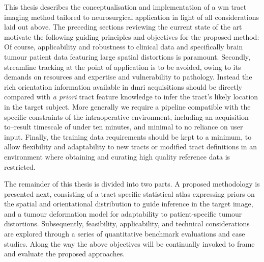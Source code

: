 This thesis describes the conceptualisation and implementation of a \gls{wm} tract imaging method tailored to neurosurgical application in light of all considerations laid out above.
The preceding sections reviewing the current state of the art motivate the following guiding principles and objectives for the proposed method:
Of course, applicability and robustness to clinical data and specifically brain tumour patient data featuring large spatial distortions is paramount.
Secondly, streamline tracking at the point of application is to be avoided, owing to its demands on resources and expertise and vulnerability to pathology.
Instead the rich orientation information available in \gls{dmri} acquisitions should be directly compared with \textit{a priori} tract feature knowledge to infer the tract's likely location in the target subject.
More generally we require a pipeline compatible with the specific constraints of the intraoperative environment, including an acquisition--to--result timescale of under ten minutes, and minimal to no reliance on user input.
Finally, the training data requirements should be kept to a minimum, to allow flexibility and adaptability to new tracts or modified tract definitions in an environment where obtaining and curating high quality reference data is restricted.

The remainder of this thesis is divided into two parts.
A proposed methodology is presented next, consisting of a tract specific statistical atlas expressing priors on the spatial and orientational distribution to guide inference in the target image, and a tumour deformation model for adaptability to patient-specific tumour distortions.
Subsequently, feasibility, applicability, and technical considerations are explored through a series of quantitative benchmark evaluations and case studies.
Along the way the above objectives will be continually invoked to frame and evaluate the proposed approaches.

